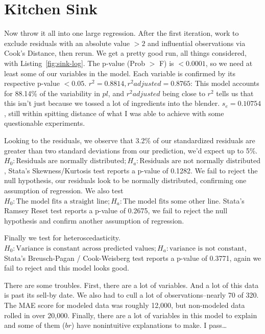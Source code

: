 \documentclass[twocolumn,11pt]{article}
\begin{document}

\section*{Kitchen Sink}
Now throw it all into one large regression.
After the first iteration,
work to exclude residuals with an absolute value $>2$ and influential observations via Cook's Distance,
then rerun.
We get a pretty good run, all things considered, with Listing~\ref{fig:sink-log}.
The p-value (Prob $>$ F) is $<0.0001$, so we need at least some of our variables in the model.
Each variable is confirmed by its respective p-value $<0.05$.
$r^2 = 0.8814, r^2 adjusted = 0.8765$: This model accounts for 88.14\% of the variability in $pl$,
and $r^2 adjusted$ being close to $r^2$ tells us that this isn't just because we tossed a lot of
ingredients into the blender.
$s_e = 0.10754$, still within spitting distance of what I was
able to achieve with some questionable experiments.

Looking to the residuals, we observe that 3.2\% of our standardized residuals are greater than two standard deviations
from our prediction, we'd expect up to 5\%.
$H_0: \text{Residuals are normally distributed}; H_a: \text{Residuals are not normally distributed}$,
Stata's Skewness/Kurtosis test reports a p-value of 0.1282.
We fail to reject the null hypothesis, our residuals look to be normally distributed,
confirming one assumption of regression. We also test $H_0: \text{The model fits a straight line}; H_a: \text{The model fits some other line}$.
Stata's Ramsey Reset test reports a p-value of 0.2675, we fail to reject the null hypothesis
and confirm another assumption of regression.

Finally we test for heteroscedasticity.
$H_0: \text{Variance is constant across predicted values}; H_a: \text{variance is not constant}$,
Stata's Breusch-Pagan / Cook-Weisberg test reports a p-value of 0.3771,
again we fail to reject and this model looks good.

There are some troubles.
First, there are a lot of variables. And a lot of this data is past its sell-by date.
We also had to cull a lot of observations--nearly 70 of 320.
The MAE score for modeled data was roughly 12,000, but non-modeled data rolled in over 20,000.
Finally, there are a lot of variables in this model to explain and some of them ($br$)
have nonintuitive explanations to make.
I pass\ldots
\end{document}
